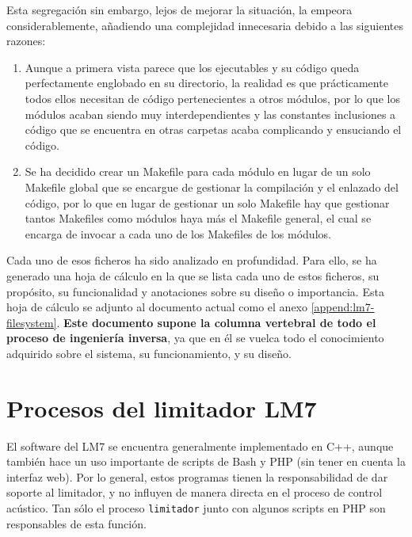 Esta segregación sin embargo, lejos de mejorar la situación, la empeora considerablemente, añadiendo una complejidad innecesaria debido a las siguientes razones:

\begin{enumerate}
    \item Aunque a primera vista parece que los ejecutables y su código queda perfectamente englobado en su directorio, la realidad es que prácticamente todos ellos necesitan de código pertenecientes a otros módulos, por lo que los módulos acaban siendo muy interdependientes y las constantes inclusiones a código que se encuentra en otras carpetas acaba complicando y ensuciando el código.

    \item Se ha decidido crear un Makefile para cada módulo en lugar de un solo Makefile global que se encargue de gestionar la compilación y el enlazado del código, por lo que en lugar de gestionar un solo Makefile hay que gestionar tantos Makefiles como módulos haya más el Makefile general, el cual se encarga de invocar a cada uno de los Makefiles de los módulos.
\end{enumerate}

Cada uno de esos ficheros ha sido analizado en profundidad. Para ello, se ha generado una hoja de cálculo en la que se lista cada uno de estos ficheros, su propósito, su funcionalidad y anotaciones sobre su diseño o importancia. Esta hoja de cálculo se adjunto al documento actual como el anexo \ref{append:lm7-filesystem}. \textbf{Este documento supone la columna vertebral de todo el proceso de ingeniería inversa}, ya que en él se vuelca todo el conocimiento adquirido sobre el sistema, su funcionamiento, y su diseño.

\section{Procesos del limitador LM7} \label{sec:lm7-procesos}

El software del LM7 se encuentra generalmente implementado en C++, aunque también hace un uso importante de scripts de Bash y PHP (sin tener en cuenta la interfaz web). Por lo general, estos programas tienen la responsabilidad de dar soporte al limitador, y no influyen de manera directa en el proceso de control acústico. Tan sólo el proceso \verb|limitador| junto con algunos scripts en PHP son responsables de esta función.

